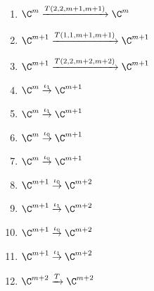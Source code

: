 \begin{enumerate}[label = (\arabic*)]
\item $\C^m \xrightarrow{T(2,2,m+1,m+1)} \C^m$

\item $\C^{m+1} \xrightarrow{T(1,1,m+1,m+1)} \C^{m+1}$

\item $\C^{m+1} \xrightarrow{T(2,2,m+2,m+2)} \C^{m+1}$

\item $\C^{m} \overset{\iota_1}{\rightarrow} \C^{m+1}$

\item $\C^{m} \overset{\iota_1}{\rightarrow} \C^{m+1}$

\item $\C^{m} \overset{\iota_0}{\rightarrow} \C^{m+1}$

\item $\C^{m} \overset{\iota_0}{\rightarrow} \C^{m+1}$

\item $\C^{m+1} \overset{\iota_0}{\rightarrow} \C^{m+2}$

\item $\C^{m+1} \overset{\iota_1}{\rightarrow} \C^{m+2}$

\item $\C^{m+1} \overset{\iota_0}{\rightarrow} \C^{m+2}$

\item $\C^{m+1} \overset{\iota_1}{\rightarrow} \C^{m+2}$

\item $\C^{m+2} \xrightarrow{T} \C^{m+2}$
\end{enumerate}

